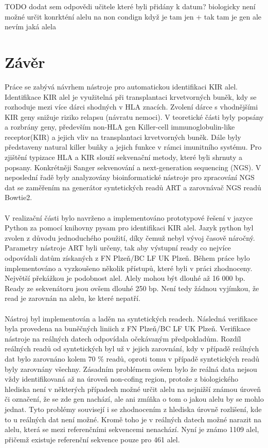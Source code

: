 \documentclass[czech,DP]{thesiskiv}
\numberwithin{equation}{section}
\begin{document}
TODO dodat sem odpovědi učitele které byli přidány k datum?
biologicky není možné určit konrkténí alelu na non condign 
když je tam jen + tak tam je gen ale nevím jaká alela


\chapter{Závěr}
Práce se zabývá návrhem nástroje pro automatickou identifikaci KIR alel. Identifikace KIR alel je využitelná při transplantaci krvetvorných buněk, kdy se rozhoduje mezi více dárci shodných v HLA znacích. Zvolení dárce s vhodnějšími KIR geny snižuje riziko relapsu (návratu nemoci). V teoretické části byly popsány a rozbrány geny, především non-HLA gen Killer-cell immunoglobulin-like receptor(KIR) a jejich vliv na transplantaci krvetvorných buněk. Dále byly představeny natural killer buňky a jejich funkce v rámci imunitního systému. Pro zjištění typizace HLA a KIR slouží sekvenační metody, které byli shrnuty a popsany. Konkrétněji Sanger sekvenování a next-generation sequencing (NGS). V neposlední řadě byly analyzovány bioinformatické nástroje pro zpracování NGS dat se zaměřením na generátor syntetických readů ART a zarovnávač NGS readů Bowtie2.
\\
\\
V realizační části bylo navrženo a implementováno prototypové řešení v jazyce Python za pomocí knihovny pysam pro identifikaci KIR alel. Jazyk python byl zvolen z důvodu jednoduchého použití, díky čemuž nebyl vývoj časově náročný. Parametry nástroje ART byli určeny, tak aby výstupní ready co nejvíce odpovídali datům získaných z FN Plzeň/BC LF UK Plzeň. Během práce bylo implementováno a vyzkoušeno několik přístupů, které byli v práci zhodnoceny. Největší překážkou je podobnost alel. Alely mohou být dlouhé až 16 000 bp. Ready ze sekvenátoru jsou ovšem dlouhé 250 bp. Není tedy žádnou vyjímkou, že read je zarovnán na alelu, ke které nepatří. 
\\
\\
Nástroj byl implementován a laděn na syntetických readech. Následná verifikace byla provedena na buněčných liniich z FN Plzeň/BC LF UK Plzeň. Verifikace nástroje na reálných datech odpovídala očekávaným předpokladům. Rozdíl reálných readů od syntetických byl už v jejich zarovnání, kdy v případě reálných dat bylo zarovnáno kolem 70 \% readů, oproti tomu v případě syntetických readů byly zarovnány všechny. Zásadním problémem ovšem bylo že reálná data nejsou vždy identifikovaná až na úroveň non-cofing region, protože z biologického hlediska není v některých případech možné určit alelu na nejnižší známou úroveň či označení, že se zde gen nachází, ale ani zmíňka o tom o jakou alelu by se mohlo jednat. Tyto problémy souvisejí i se zhodnocením z hlediska úrovně rozlišení, kde to u reálných dat není možné. Kromě toho je v reálných datech možné narazit na alelu, která se mezi referenčními sekvencemi nenachází. Nyní je známo 1109 alel, přičemž existuje referenční sekvence pouze pro 461 alel.
\end{document}
